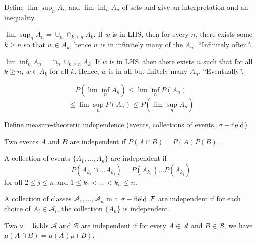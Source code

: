 \documentclass[avery5388,grid,frame]{flashcards}
\begin{document}
\begin{flashcard}
    {Define $\lim \sup_n A_n$ and $\lim \inf_n A_n$ of sets and give an interpretation and an inequality}
    \begin{definition}
        $\lim \sup_n A_n = \cup_n \cap_{k \geq n} A_k$. If $w$ is in LHS, then for every $n$, there exists some $k \geq n$ so that $w \in A_k$, hence $w$ is in infinitely many of the $A_n$. ``Infinitely often''.
    \end{definition}
    \begin{definition}
        $\lim \inf_n A_n = \cap_n \cup_{k \geq n} A_k$. If $w$ is in LHS, then there exists $n$ such that for all $k \geq n$, $w \in A_k$ for all $k$. Hence, $w$ is in all but finitely many $A_n$. ``Eventually''.
    \end{definition}
    \begin{properties}
        $$P(\lim \inf_n A_n) \leq \lim \inf_n P(A_n)$$
        $$\leq \lim \sup_n P(A_n) \leq P(\lim \sup_n A_n)$$
    \end{properties}
\end{flashcard}


\begin{flashcard}
    {Define measure-theoretic independence (events, collections of events, $\sigma-\text{field}$)}
    \begin{definition}
        Two events $A$ and $B$ are independent if $P(A \cap B) = P(A) P(B)$.
    \end{definition}

    \begin{definition}
        A collection of events $\{ A_1, \dots, A_n \}$ are independent if
        $$P(A_{k_1} \cap \dots A_{k_j}) = P(A_{k_1}) \dots P(A_{k_j})$$
        for all $2 \leq j \leq n$ and $1 \leq k_1 < \dots < k_n \leq n$.
    \end{definition}

    \begin{definition}
        A collection of classes $\mathcal A_1, \dots, \mathcal A_n$ in a $\sigma-\text{field}$ $\mathcal F$ are independent if for each choice of $A_i \in \mathcal A_i$, the collection $\{ A_n \}$ is independent.
    \end{definition}

    \begin{definition}
        Two $\sigma-\text{field}$s $\mathcal A$ and $\mathcal B$ are independent if for every $A \in \mathcal A$ and $B \in \mathcal B$, we have $\mu(A \cap B) = \mu(A) \mu(B)$.
    \end{definition}
\end{flashcard}
\end{document}
